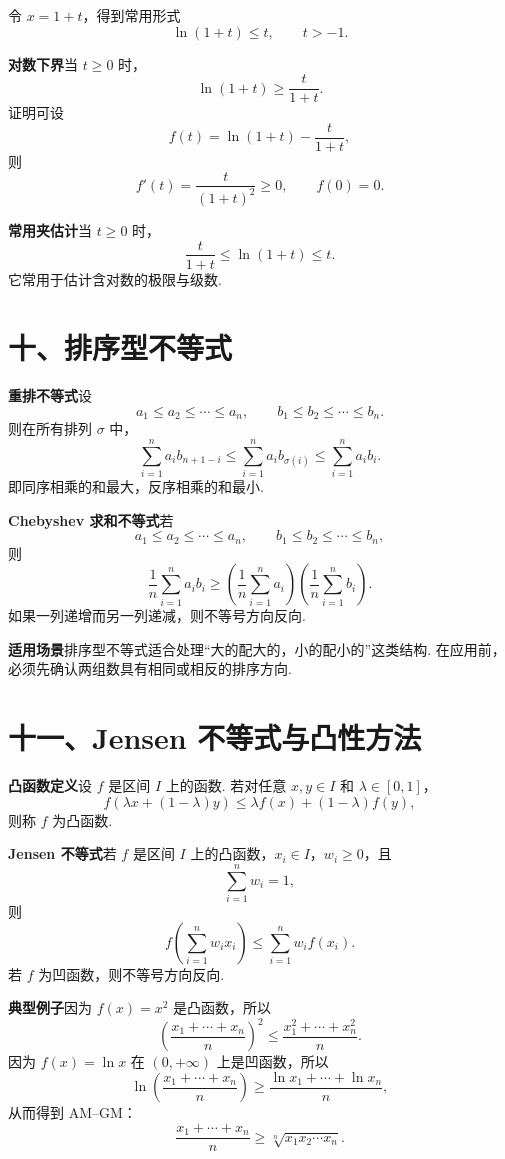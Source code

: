 \documentclass[UTF8, 12pt, fontset=fandol, oneside]{ctexart}
\begin{document}
令 $x=1+t$，得到常用形式
\[
  \ln(1+t)\le t,\qquad t>-1.
\]

\noindent\textbf{对数下界}\quad 当 $t\ge0$ 时，
\[
  \ln(1+t)\ge \frac{t}{1+t}.
\]
证明可设
\[
  f(t)=\ln(1+t)-\frac{t}{1+t},
\]
则
\[
  f'(t)=\frac{t}{(1+t)^2}\ge0,\qquad f(0)=0.
\]

\noindent\textbf{常用夹估计}\quad 当 $t\ge0$ 时，
\[
  \frac{t}{1+t}\le \ln(1+t)\le t.
\]
它常用于估计含对数的极限与级数.

\section*{十、排序型不等式}

\noindent\textbf{重排不等式}\quad 设
\[
  a_1\le a_2\le\cdots\le a_n,\qquad
  b_1\le b_2\le\cdots\le b_n.
\]
则在所有排列 $\sigma$ 中，
\[
  \sum_{i=1}^n a_i b_{n+1-i}
  \le
  \sum_{i=1}^n a_i b_{\sigma(i)}
  \le
  \sum_{i=1}^n a_i b_i.
\]
即同序相乘的和最大，反序相乘的和最小.

\noindent\textbf{Chebyshev 求和不等式}\quad 若
\[
  a_1\le a_2\le\cdots\le a_n,\qquad
  b_1\le b_2\le\cdots\le b_n,
\]
则
\[
  \frac1n\sum_{i=1}^n a_i b_i
  \ge
  \left(\frac1n\sum_{i=1}^n a_i\right)
  \left(\frac1n\sum_{i=1}^n b_i\right).
\]
如果一列递增而另一列递减，则不等号方向反向.

\noindent\textbf{适用场景}\quad 排序型不等式适合处理“大的配大的，小的配小的”这类结构. 在应用前，必须先确认两组数具有相同或相反的排序方向.

\section*{十一、Jensen 不等式与凸性方法}

\noindent\textbf{凸函数定义}\quad 设 $f$ 是区间 $I$ 上的函数. 若对任意 $x,y\in I$ 和 $\lambda\in[0,1]$，
\[
  f(\lambda x+(1-\lambda)y)
  \le
  \lambda f(x)+(1-\lambda)f(y),
\]
则称 $f$ 为凸函数.

\noindent\textbf{Jensen 不等式}\quad 若 $f$ 是区间 $I$ 上的凸函数，$x_i\in I$，$w_i\ge0$，且
\[
  \sum_{i=1}^n w_i=1,
\]
则
\[
  f\left(\sum_{i=1}^n w_i x_i\right)
  \le
  \sum_{i=1}^n w_i f(x_i).
\]
若 $f$ 为凹函数，则不等号方向反向.

\noindent\textbf{典型例子}\quad 因为 $f(x)=x^2$ 是凸函数，所以
\[
  \left(\frac{x_1+\cdots+x_n}{n}\right)^2
  \le
  \frac{x_1^2+\cdots+x_n^2}{n}.
\]
因为 $f(x)=\ln x$ 在 $(0,+\infty)$ 上是凹函数，所以
\[
  \ln\left(\frac{x_1+\cdots+x_n}{n}\right)
  \ge
  \frac{\ln x_1+\cdots+\ln x_n}{n},
\]
从而得到 AM--GM：
\[
  \frac{x_1+\cdots+x_n}{n}
  \ge
  \sqrt[n]{x_1x_2\cdots x_n}.
\]
\end{document}
